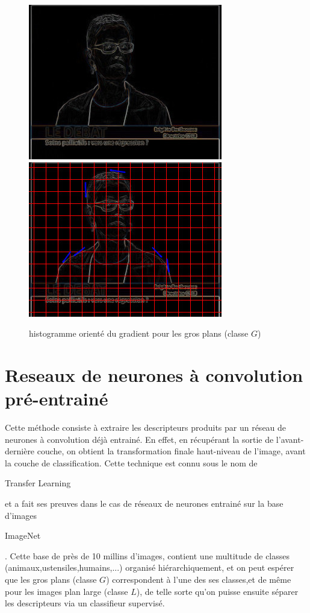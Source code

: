 \documentclass{book}
\begin{document}
\begin{figure}[H]
\begin{center}
\includegraphics[scale=0.3]{hog_exemple2_contour.jpg}
\includegraphics[scale=0.3]{hog_exemple2_gradient.jpg}
\end{center}
\caption{histogramme orienté du gradient pour les gros plans (classe $G$)}
\label{hog_classeG}
\end{figure}

\section{Reseaux de neurones à convolution pré-entrainé}

Cette méthode consiste à extraire les descripteurs produits par un réseau de neurones à convolution déjà entrainé.
En effet, en récupérant la sortie de l'avant-dernière couche, on obtient la transformation finale haut-niveau de l'image, avant la couche de classification.
Cette technique est connu sous le nom de \begin{itshape}Transfer Learning\end{itshape} \cite{DBLP:journals/corr/YosinskiCBL14} et a fait ses preuves dans 
le cas de réseaux de neurones entrainé sur la base d'images \begin{itshape}ImageNet\end{itshape} \cite{imagenet_cvpr09}.
Cette base de près de 10 millins d'images, contient une multitude de classes (animaux,ustensiles,humains,...) organisé hiérarchiquement, et on peut espérer que les gros plans
(classe $G$) correspondent à l'une des ses classes,et de même pour les images plan large (classe $L$), de telle sorte qu'on puisse ensuite séparer les descripteurs via un classifieur
 supervisé.
\end{document}
